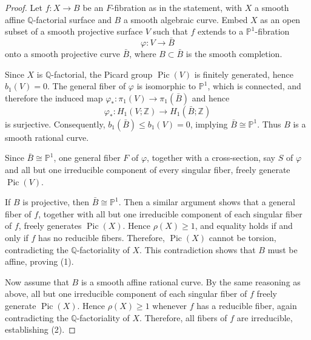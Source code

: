 \documentclass[10pt,a4paper]{amsart}
\newcommand{\PP}{\mathbb{P}}
\newcommand{\Pic}{\operatorname{Pic}}
\newcommand{\Q}{\mathbb{Q}}
\newcommand{\Z}{\mathbb{Z}}
\begin{document}
\begin{proof}
Let $f : X \to B$ be an $F$-fibration as in the statement, with $X$ a smooth affine $\Q$-factorial surface and $B$ a smooth algebraic curve. Embed $X$ as an open subset of a smooth projective surface $V$ such that $f$ extends to a $\PP^1$-fibration 
\[
\varphi : V \to \bar{B}
\]
onto a smooth projective curve $\bar{B}$, where $B \subset \bar{B}$ is the smooth completion.

Since $X$ is $\Q$-factorial, the Picard group $\Pic(V)$ is finitely generated, hence $b_1(V)=0$. The general fiber of $\varphi$ is isomorphic to $\PP^1$, which is connected, and therefore the induced map $\varphi_\ast : \pi_1(V) \to \pi_1(\bar{B})$ and hence
\[
\varphi_\ast : H_1(V; \Z) \to H_1(\bar{B}; \Z)
\]
is surjective. Consequently, $b_1(\bar{B}) \le b_1(V) = 0$, implying $\bar{B} \cong \PP^1$. Thus $B$ is a smooth rational curve.

Since $\bar{B} \cong \PP^1$, one general fiber $F$ of $\varphi$, together with a cross-section, say $S$ of $\varphi$ and all but one irreducible component of every singular fiber, freely generate $\Pic(V)$.  

If $B$ is projective, then $\bar{B} \cong \PP^1$. Then a similar argument shows that a general fiber of $f$, together with all but one irreducible component of each singular fiber of $f$, freely generates $\Pic(X)$. Hence $\rho(X) \ge 1$, and equality holds if and only if $f$ has no reducible fibers. Therefore, $\Pic(X)$ cannot be torsion, contradicting the $\Q$-factoriality of $X$. This contradiction shows that $B$ must be affine, proving (1).

Now assume that $B$ is a smooth affine rational curve. By the same reasoning as above, all but one irreducible component of each singular fiber of $f$ freely generate $\Pic(X)$. Hence $\rho(X) \ge 1$ whenever $f$ has a reducible fiber, again contradicting the $\Q$-factoriality of $X$. Therefore, all fibers of $f$ are irreducible, establishing (2).
\end{proof}
\end{document}
